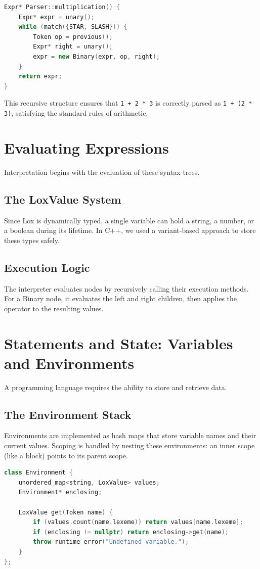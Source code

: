 \documentclass[12pt,a4paper,oneside]{report}
\begin{document}
\begin{lstlisting}[language=C++]
Expr* Parser::multiplication() {
    Expr* expr = unary();
    while (match({STAR, SLASH})) {
        Token op = previous();
        Expr* right = unary();
        expr = new Binary(expr, op, right);
    }
    return expr;
}
\end{lstlisting}

This recursive structure ensures that \texttt{1 + 2 * 3} is correctly parsed as \texttt{1 + (2 * 3)}, satisfying the standard rules of arithmetic.

\chapter{Evaluating Expressions}
Interpretation begins with the evaluation of these syntax trees.

\section{The LoxValue System}
Since Lox is dynamically typed, a single variable can hold a string, a number, or a boolean during its lifetime. In C++, we used a variant-based approach to store these types safely.

\section{Execution Logic}
The interpreter evaluates nodes by recursively calling their execution methods. For a Binary node, it evaluates the left and right children, then applies the operator to the resulting values.

\chapter{Statements and State: Variables and Environments}
A programming language requires the ability to store and retrieve data.

\section{The Environment Stack}
Environments are implemented as hash maps that store variable names and their current values. Scoping is handled by nesting these environments: an inner scope (like a block) points to its parent scope.

\begin{lstlisting}[language=C++]
class Environment {
    unordered_map<string, LoxValue> values;
    Environment* enclosing;

    LoxValue get(Token name) {
        if (values.count(name.lexeme)) return values[name.lexeme];
        if (enclosing != nullptr) return enclosing->get(name);
        throw runtime_error("Undefined variable.");
    }
};
\end{lstlisting}
\end{document}
